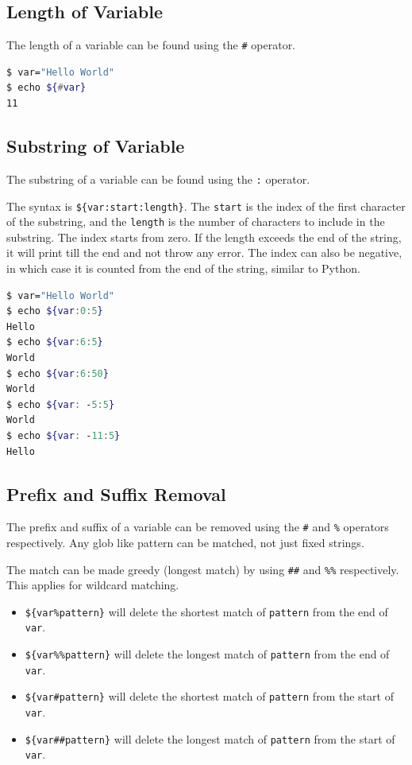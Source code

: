 \subsection{Length of Variable}

The length of a variable can be found using the \lstinline{#} operator.

\begin{lstlisting}[language=bash]
$ var="Hello World"
$ echo ${#var}
11
\end{lstlisting}

\subsection{Substring of Variable}

The substring of a variable can be found using the \lstinline{:} operator.

The syntax is \lstinline|${var:start:length}|. The \lstinline{start} is the index of the first character of the substring, and the \lstinline{length} is the number of characters to include in the substring. The index starts from zero.
If the length exceeds the end of the string, it will print till the end and not throw any error.
The index can also be negative, in which case it is counted from the end of the string, similar to Python.

\begin{lstlisting}[language=bash]
$ var="Hello World"
$ echo ${var:0:5}
Hello
$ echo ${var:6:5}
World
$ echo ${var:6:50}
World
$ echo ${var: -5:5}
World
$ echo ${var: -11:5}
Hello
\end{lstlisting}

\subsection{Prefix and Suffix Removal}

The prefix and suffix of a variable can be removed using the \lstinline{#} and \lstinline{%} operators respectively. Any glob like pattern can be matched, not just fixed strings.

The match can be made greedy (longest match) by using \lstinline{##} and \lstinline{%%} respectively.
This applies for wildcard matching.


\begin{itemize}
  \item
    \lstinline|${var%pattern}| will delete the shortest match of \lstinline{pattern} from the end of \lstinline{var}.
  \item
    \lstinline|${var%%pattern}| will delete the longest match of \lstinline{pattern} from the end of \lstinline{var}.
  \item
    \lstinline|${var#pattern}| will delete the shortest match of \lstinline{pattern} from the start of \lstinline{var}.
  \item
    \lstinline|${var##pattern}| will delete the longest match of \lstinline{pattern} from the start of \lstinline{var}.
\end{itemize}

